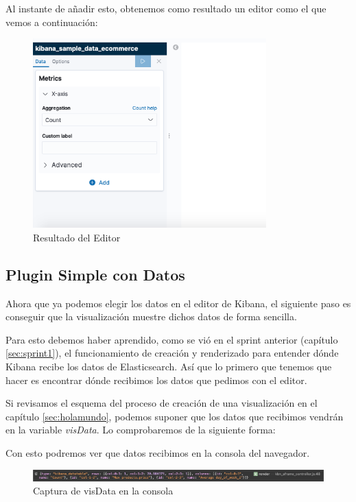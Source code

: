 \documentclass[a4paper, 12pt]{book}
\begin{document}
Al instante de añadir esto, obtenemos como resultado un editor como el que vemos a continuación:

\begin{figure}[H]
  \centering
  \includegraphics[width=9cm, keepaspectratio]{img/development/editor-resultado.png}
  \caption{Resultado del Editor}
  \label{fig:editor}
\end{figure}

\subsection{Plugin Simple con Datos}
\label{sec:holamundocondatos}

Ahora que ya podemos elegir los datos en el editor de Kibana, el siguiente paso es conseguir que la visualización muestre dichos datos de forma sencilla.

Para esto debemos haber aprendido, como se vió en el sprint anterior (capítulo \ref{sec:sprint1}), el funcionamiento de creación y renderizado para entender dónde Kibana recibe los datos de Elasticsearch. Así que lo primero que tenemos que hacer es encontrar dónde recibimos los datos que pedimos con el editor.

Si revisamos el esquema del proceso de creación de una visualización en el capítulo \ref{sec:holamundo}, podemos suponer que los datos que recibimos vendrán en la variable \textit{visData}. Lo comprobaremos de la siguiente forma:



Con esto podremos ver que datos recibimos en la consola del navegador.

\begin{figure}[H]
  \centering
  \includegraphics[width=16cm, keepaspectratio]{img/development/captura-visData.png}
  \caption{Captura de visData en la consola}
  \label{fig:visData}
\end{figure}
\end{document}
